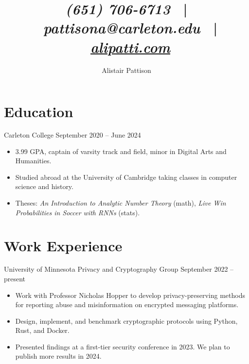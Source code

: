 \documentclass{resume}
\author{Alistair Pattison}
\title{
{\it (651) 706-6713}
\ | \
{\it pattisona@carleton.edu}
\ | \
\href{http://alipatti.com}{\it alipatti.com}
}
\begin{document}
\maketitle

\section{Education}

{Carleton College}
{September 2020 -- June 2024}

\begin{itemize}
	\item 3.99 GPA, captain of varsity track and field, minor in Digital Arts and Humanities.
	\item Studied abroad at the University of Cambridge taking classes in computer science and history.
	\item Theses:
	      \textit{An Introduction to Analytic Number Theory} (math),
	      \textit{Live Win Probabilities in Soccer with RNNs} (stats).
\end{itemize}

%

\section{Work Experience}

{University of Minnesota Privacy and Cryptography Group}
{September 2022 -- present}

\begin{itemize}
	\item Work with Professor Nicholas Hopper to develop privacy-preserving methods for reporting abuse and misinformation on encrypted messaging platforms.
	\item Design, implement, and benchmark cryptographic protocols using Python, Rust, and Docker.
	\item Presented findings at a first-tier security conference in 2023. We plan to publish more results in 2024.
\end{itemize}
\end{document}
